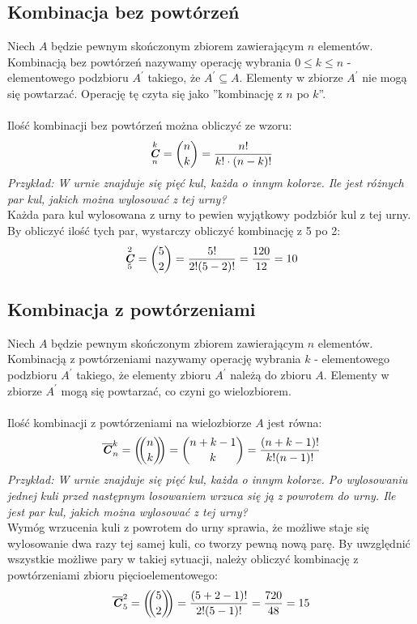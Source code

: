 \documentclass[14pt,a4paper]{extarticle}
\DeclareMathOperator{\varcomb}{\textbf{\textit{C}}}
\begin{document}
\subsection*{Kombinacja bez powtórzeń}
\noindent Niech $A$ będzie pewnym skończonym zbiorem zawierającym $n$ elementów.
Kombinacją bez powtórzeń nazywamy operację wybrania $0 \leq k \leq n$ - elementowego podzbioru $A^{\prime}$ takiego, że
$A^{\prime} \subseteq A$. Elementy w zbiorze $A^{\prime}$ nie mogą się powtarzać. Operację tę czyta się jako ''kombinację z $n$ po $k$''.\\\\
Ilość kombinacji bez powtórzeń można obliczyć ze wzoru:
\[\varcomb^{k}_{n} = \dbinom{n}{k} = \dfrac{n!}{k!\cdot (n-k)!}\]
\noindent\textit{Przykład: W urnie znajduje się pięć kul, każda o innym kolorze. Ile jest różnych
par kul, jakich można wylosować z tej urny?}\\
\noindent Każda para kul wylosowana z urny to pewien wyjątkowy podzbiór kul z tej urny. By obliczyć
ilość tych par, wystarczy obliczyć kombinację z 5 po 2:
\[\varcomb^{2}_{5} = \dbinom{5}{2} = \dfrac{5!}{2!(5-2)!} = \dfrac{120}{12}=10\]


\subsection*{Kombinacja z powtórzeniami}
\noindent Niech $A$ będzie pewnym skończonym zbiorem zawierającym $n$ elementów.
Kombinacją z powtórzeniami nazywamy operację wybrania $k$ - elementowego podzbioru $A^{\prime}$ takiego,
 że elementy zbioru $A^{\prime}$ należą do zbioru $A$. 
Elementy w zbiorze $A^{\prime}$ mogą się powtarzać, co czyni go wielozbiorem.\\\\
Ilość kombinacji z powtórzeniami na wielozbiorze $A$
jest równa:
\[\overline{\varcomb}^{k}_{n} = \left(\!\!\dbinom{n}{k}\!\!\right) = \dbinom{n+k-1}{k} = \dfrac{(n+k-1)!}{k!(n-1)!}\]
\noindent\textit{Przykład: W urnie znajduje się pięć kul, każda o innym kolorze. Po wylosowaniu jednej kuli przed
następnym losowaniem wrzuca się ją z powrotem do urny. Ile jest par kul, jakich można 
wylosować z tej urny?}\\
Wymóg wrzucenia kuli z powrotem do urny sprawia, że możliwe staje się wylosowanie dwa razy tej
samej kuli, co tworzy pewną nową parę. By uwzględnić wszystkie możliwe pary w takiej sytuacji,
należy obliczyć kombinację z powtórzeniami zbioru pięcioelementowego:
\[\overline{\varcomb}^{2}_{5} = \left(\!\!\dbinom{5}{2}\!\!\right) = \dfrac{(5+2-1)!}{2!(5-1)!} = \dfrac{720}{48} = 15\]
\end{document}
